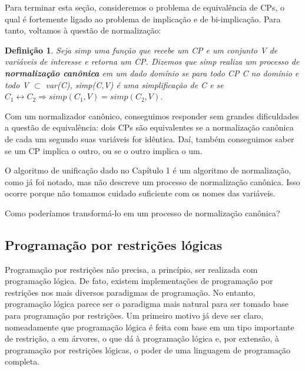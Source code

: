 \documentclass{article}
\newtheorem{definition}{Definição}[section]
\theoremstyle{remark}
\theoremstyle{theorem}
\begin{document}
  Para terminar esta seção, consideremos o problema de equivalência de CPs, o qual é fortemente ligado ao problema de implicação e de bi-implicação. Para tanto, voltamos à questão de normalização:

  \begin{definition}
    Seja \textit{simp} uma função que recebe um CP e um conjunto V de variáveis de interesse e retorna um CP. Dizemos que \textit{simp} realiza um processo de \textbf{normalização canônica} em um dado domínio se para todo CP C no domínio e todo V $\subset$ var(C), simp(C,V) é uma simplificação de C e se $C_1 \leftrightarrow C_2 \Rightarrow simp(C_1,V) = simp(C_2,V)$.
  \end{definition}

  Com um normalizador canônico, conseguimos responder sem grandes dificuldades a questão de equivalência: dois CPs são equivalentes se a normalização canônica de cada um segundo suas variáveis for idêntica. Daí, também conseguimos saber se um CP implica o outro, ou se o outro implica o um.

  O algoritmo de unificação dado no Capítulo 1 %
é um algoritmo de normalização, como já foi notado, mas não descreve um processo de normalização canônica. Isso ocorre porque não tomamos cuidado suficiente com os nomes das variáveis.

Como poderíamos transformá-lo em um processo de normalização canônica?

\subsection{Programação por restrições lógicas}

Programação por restrições não precisa, a princípio, ser realizada com programação lógica. De fato, existem implementações de
programação por restrições nos mais diversos paradigmas de programação. No entanto, programação lógica parece ser o paradigma mais natural
para ser tomado base para programação por restrições. Um primeiro motivo já deve ser claro, nomeadamente que programação lógica é feita com base em um tipo importante de restrição, a em árvores, o que dá à programação lógica e, por extensão, à programação
por restrições lógicas, o poder de uma linguagem de programação completa.
\end{document}
